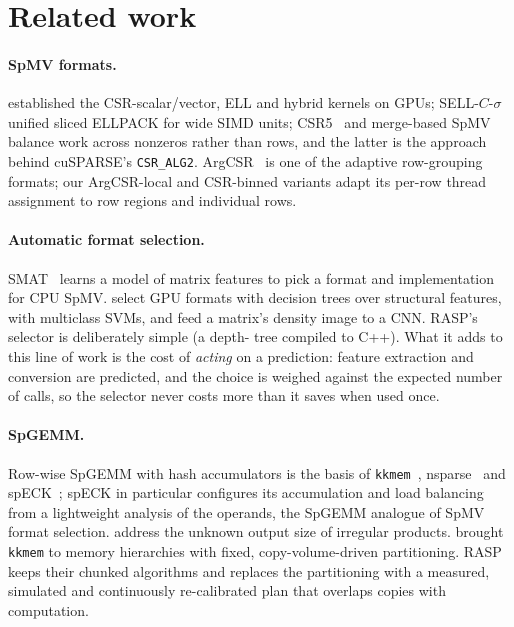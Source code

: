\section{Related work}\label{sec:related}

\paragraph{SpMV formats.} \citet{bell2009spmv} established the CSR-scalar/vector, ELL and hybrid kernels on GPUs;
SELL-$C$-$\sigma$~\cite{kreutzer2014sell} unified sliced ELLPACK for wide SIMD units; CSR5~\cite{liu2015csr5} and
merge-based SpMV~\cite{merrill2016merge} balance work across nonzeros rather than rows, and the latter is the approach
behind cuSPARSE's \texttt{CSR\_ALG2}. ArgCSR~\cite{heller2012argcsr} is one of the adaptive row-grouping formats; our
ArgCSR-local and CSR-binned variants adapt its per-row thread assignment to row regions and individual rows.

\paragraph{Automatic format selection.} SMAT~\cite{li2013smat} learns a model of matrix features to pick a format
and implementation for CPU SpMV. \citet{sedaghati2015selection} select GPU formats with decision trees over structural
features, \citet{benatia2016svm} with multiclass SVMs, and \citet{zhao2018cnn} feed a matrix's density image to a
CNN. RASP's selector is deliberately simple (a depth- tree compiled to C++). What it adds to this
line of work is the cost of \emph{acting} on a prediction: feature extraction and conversion are predicted, and the
choice is weighed against the expected number of calls, so the selector never costs more than it saves when used once.

\paragraph{SpGEMM.} Row-wise SpGEMM with hash accumulators is the basis of \texttt{kkmem}~\cite{deveci2018kkmem},
nsparse~\cite{nagasaka2017nsparse} and spECK~\cite{parger2020speck}; spECK in particular configures its
accumulation and load balancing from a lightweight analysis of the operands, the SpGEMM analogue of SpMV format
selection. \citet{liu2014spgemm} address the unknown output size of irregular products. \citet{deveci2018multilevel} brought \texttt{kkmem}
to memory hierarchies with fixed, copy-volume-driven partitioning. RASP keeps their chunked algorithms and replaces
the partitioning with a measured, simulated and continuously re-calibrated plan that overlaps copies with
computation.
